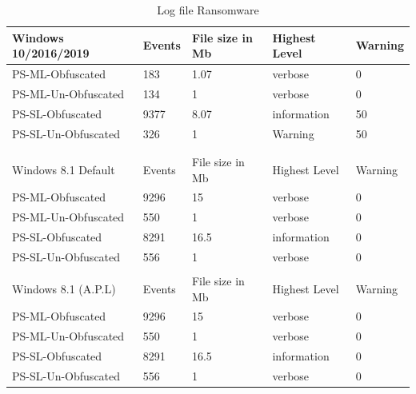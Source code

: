 \documentclass{article}%
\begin{document}
\begin{table}[]
\caption {Log file Ransomware}
\label{tab:table_eight}
\begin{center}
\begin{tabular}{|l|l|l|l|l|}
\hline
Windows 10/2016/2019 & Events & File size in Mb & Highest Level & Warning \\\hline
PS-ML-Obfuscated     & 183    & 1.07            & verbose       & 0       \\\hline
PS-ML-Un-Obfuscated  & 134    & 1               & verbose       & 0       \\\hline
PS-SL-Obfuscated     & 9377   & 8.07            & information   & 50      \\\hline
PS-SL-Un-Obfuscated  & 326    & 1               & Warning       & 50      \\\hline
                     &        &                 &               &         \\\hline
                     &        &                 &               &         \\\hline
Windows 8.1 Default  & Events & File size in Mb & Highest Level & Warning \\\hline
PS-ML-Obfuscated     & 9296   & 15              & verbose       & 0       \\\hline
PS-ML-Un-Obfuscated  & 550    & 1               & verbose       & 0       \\\hline
PS-SL-Obfuscated     & 8291   & 16.5            & information   & 0       \\\hline
PS-SL-Un-Obfuscated  & 556    & 1               & verbose       & 0       \\\hline
                     &        &                 &               &         \\\hline
Windows 8.1 (A.P.L)  & Events & File size in Mb & Highest Level & Warning \\\hline
PS-ML-Obfuscated     & 9296   & 15              & verbose       & 0       \\\hline
PS-ML-Un-Obfuscated  & 550    & 1               & verbose       & 0       \\\hline
PS-SL-Obfuscated     & 8291   & 16.5            & information   & 0       \\\hline
PS-SL-Un-Obfuscated  & 556    & 1               & verbose       & 0       \\\hline
\end{tabular}
\end{center}
\end{table}
\end{document}

